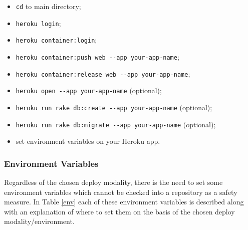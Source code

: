 \documentclass[a4paper, english]{article}
\newcounter{subsubsubsection}[subsubsection]
\begin{document}

\begin{itemize}
\item \verb|cd| to main directory;
\item \verb|heroku login|;
\item \verb|heroku container:login|;
\item \verb|heroku container:push web --app your-app-name|;
\item \verb|heroku container:release web --app your-app-name|;
\item \verb|heroku open --app your-app-name| (optional);
\item \verb|heroku run rake db:create --app your-app-name| (optional);
\item \verb|heroku run rake db:migrate --app your-app-name| (optional);
\item set environment variables on your Heroku app.
\end{itemize}

\subsubsection{Environment Variables}

Regardless of the chosen deploy modality, there is the need to set some environment variables which cannot be checked into a repository as a safety measure. In Table \ref{env} each of these environment variables is described along with an explanation of where to set them on the basis of the chosen deploy modality/environment. 
\end{document}

